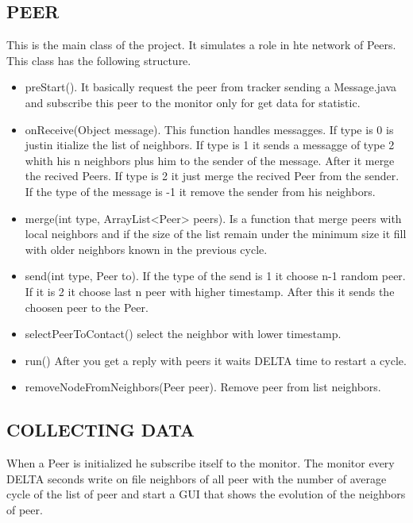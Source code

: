 \documentclass[a4paper,12pt,notitlepage]{article} %
\begin{document}
\subsection{PEER}
	This is the main class of the project. It simulates a role in hte network of Peers. This class has the following structure.  
\begin{itemize}
\item preStart(). It basically request the peer from tracker sending a Message.java and subscribe this peer to the monitor only for get data for statistic.
\item onReceive(Object message). This function handles messagges. If type is 0 is justin itialize the list of neighbors. If type is 1 it sends a messagge of type 2 whith his n neighbors plus him to the sender of the message. After it merge the recived Peers. If type is 2 it just merge the recived Peer from the sender. If the type of the message is -1 it remove the sender from his neighbors.
\item merge(int type, ArrayList<Peer> peers). Is a function that merge peers with local neighbors and if the size of the list remain under the minimum size it fill with older neighbors known in the previous cycle.
\item send(int type, Peer to). If the type of the send is 1 it choose n-1 random peer. If it is 2 it choose last n peer with higher timestamp. After this it sends the choosen peer to the Peer.
\item selectPeerToContact() select the neighbor with lower timestamp.
\item run() After you get a reply with peers it waits DELTA time to restart a cycle.
\item removeNodeFromNeighbors(Peer peer). Remove peer from list neighbors.

\end{itemize}

\subsection{COLLECTING DATA}
	When a Peer is initialized he subscribe itself to the monitor. The monitor every DELTA seconds write on file neighbors of all peer with the number of average cycle of the list of peer and start a GUI that shows the evolution of the neighbors of peer.
\end{document}
